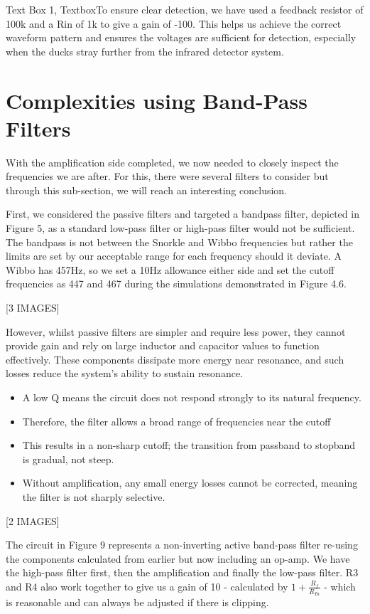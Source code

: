 Text Box 1, TextboxTo ensure clear detection, we have used a feedback resistor of 100k and a Rin of 1k to give a gain of -100. This helps us achieve the correct waveform pattern and ensures the voltages are sufficient for detection, especially when the ducks stray further from the infrared detector system.

\section{Complexities using Band-Pass Filters}
With the amplification side completed, we now needed to closely inspect the frequencies we are after. For this, there were several filters to consider but through this sub-section, we will reach an interesting conclusion.

First, we considered the passive filters and targeted a bandpass filter, depicted in Figure 5, as a standard low-pass filter or high-pass filter would not be sufficient. The bandpass is not between the Snorkle and Wibbo frequencies but rather the limits are set by our acceptable range for each frequency should it deviate. A Wibbo has 457Hz, so we set a 10Hz allowance either side and set the cutoff frequencies as 447 and 467 during the simulations demonstrated in Figure 4.6.

    [3 IMAGES]

However, whilst passive filters are simpler and require less power, they cannot provide gain and rely on large inductor and capacitor values to function effectively. These components dissipate more energy near resonance, and such losses reduce the system's ability to sustain resonance.
\begin{itemize}
    \item A low Q means the circuit does not respond strongly to its natural frequency.
    \item Therefore, the filter allows a broad range of frequencies near the cutoff
    \item This results in a non-sharp cutoff; the transition from passband to stopband is gradual, not steep.
    \item Without amplification, any small energy losses cannot be corrected, meaning the filter is not sharply selective.
\end{itemize}

[2 IMAGES]

The circuit in Figure 9 represents a non-inverting active band-pass filter re-using the components calculated from earlier but now including an op-amp. We have the high-pass filter first, then the amplification and finally the low-pass filter. R3 and R4 also work together to give us a gain of 10 - calculated by \(1+ \frac{R_f}{R_{In}} \) - which is reasonable and can always be adjusted if there is clipping.

